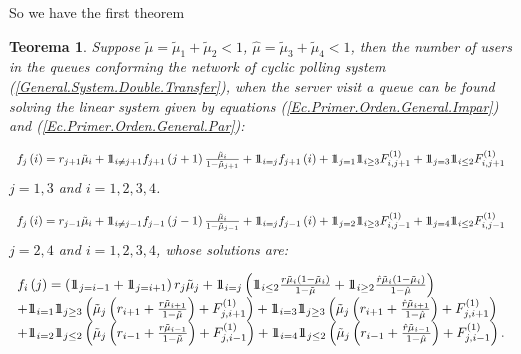 \documentclass{article}
\newtheorem{Teo}{Teorema}
\newcommand{\indora}{\mbox{$1$\hspace{-0.8ex}$1$}}
\begin{document}
So we have the first theorem

\begin{Teo}
Suppose  $\tilde{\mu}=\tilde{\mu}_{1}+\tilde{\mu}_{2}<1$, $\hat{\mu}=\tilde{\mu}_{3}+\tilde{\mu}_{4}<1$, then the number of users in the queues conforming the network of cyclic polling system (\ref{General.System.Double.Transfer}), when the server visit a queue can be found solving the linear system given by equations (\ref{Ec.Primer.Orden.General.Impar}) and (\ref{Ec.Primer.Orden.General.Par}):

\begin{eqnarray}\label{Ec.Primer.Orden.General.Impar}
\begin{array}{l}
f_{j}\left(i\right)=r_{j+1}\tilde{\mu}_{i}
+\indora_{i\neq j+1}f_{j+1}\left(j+1\right)\frac{\tilde{\mu}_{i}}{1-\tilde{\mu}_{j+1}}
+\indora_{i=j}f_{j+1}\left(i\right)
+\indora_{j=1}\indora_{i\geq3}F_{i,j+1}^{(1)}
+\indora_{j=3}\indora_{i\leq2}F_{i,j+1}^{(1)}
\end{array}
\end{eqnarray}
$j=1,3$ and $i=1,2,3,4$.

\begin{eqnarray}\label{Ec.Primer.Orden.General.Par}
\begin{array}{l}
f_{j}\left(i\right)=r_{j-1}\tilde{\mu}_{i}
+\indora_{i\neq j-1}f_{j-1}\left(j-1\right)\frac{\tilde{\mu}_{i}}{1-\tilde{\mu}_{j-1}}
+\indora_{i=j}f_{j-1}\left(i\right)
+\indora_{j=2}\indora_{i\geq3}F_{i,j-1}^{(1)}
+\indora_{j=4}\indora_{i\leq2}F_{i,j-1}^{(1)}
\end{array}
\end{eqnarray}
$j=2,4$ and $i=1,2,3,4$, whose solutions are:


\begin{eqnarray}
\begin{array}{l}
f_{i}\left(j\right)=\left(\indora_{j=i-1}+\indora_{j=i+1}\right)r_{j}\tilde{\mu}_{j}+\indora_{i=j}\left(\indora_{i\leq2}\frac{r\tilde{\mu}_{i}\left(1-\tilde{\mu}_{i}\right)}{1-\tilde{\mu}}+\indora_{i\geq2}\frac{\hat{r}\tilde{\mu}_{i}\left(1-\tilde{\mu}_{i}\right)}{1-\hat{\mu}}\right)\\
+\indora_{i=1}\indora_{j\geq3}\left(\tilde{\mu}_{j}\left(r_{i+1}+\frac{r\tilde{\mu}_{i+1}}{1-\tilde{\mu}}\right)+F_{j,i+1}^{(1)}\right)
+\indora_{i=3}\indora_{j\geq3}\left(\tilde{\mu}_{j}\left(r_{i+1}+\frac{\hat{r}\tilde{\mu}_{i+1}}{1-\hat{\mu}}\right)+F_{j,i+1}^{(1)}\right)\\
+\indora_{i=2}\indora_{j\leq2}\left(\tilde{\mu}_{j}\left(r_{i-1}+\frac{r\tilde{\mu}_{i-1}}{1-\tilde{\mu}}\right)+F_{j,i-1}^{(1)}\right)
+\indora_{i=4}\indora_{j\leq2}\left(\tilde{\mu}_{j}\left(r_{i-1}+\frac{\hat{r}\tilde{\mu}_{i-1}}{1-\hat{\mu}}\right)+F_{j,i-1}^{(1)}\right).
\end{array}
\end{eqnarray}
\end{Teo}
\end{document}
